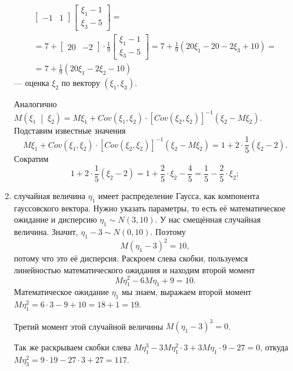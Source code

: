 \begin{enumerate}[label=\alph*)]
\begin{equation*}
\begin{split}
\begin{bmatrix}
        -1 & 1
      \end{bmatrix}
      \begin{bmatrix}
        \xi_1 - 1 \\
        \xi_3 - 5
      \end{bmatrix} = \\
      = 7 +
      \begin{bmatrix}
        20 & -2
      \end{bmatrix} \cdot \frac{1}{9}
      \begin{bmatrix}
        \xi_1 - 1 \\
        \xi_3 - 5
      \end{bmatrix} =
      7 + \frac{1}{9} \left( 20 \xi_1 - 20 - 2 \xi_3 + 10 \right) = \\
      = 7 + \frac{1}{9} \left( 20 \xi_1 - 2 \xi_2 - 10 \right)
    \end{split}
  \end{equation*}
  --- оценка $ \xi_2$ по вектору $ \left( \xi_1, \xi_3 \right) $.

  Аналогично
  $M \left( \xi_1 \; \middle| \; \xi_2 \right) =
    M \xi_1 + Cov \left( \xi_1, \xi_2 \right) \cdot
    \left[ Cov \left( \xi_2, \xi_2 \right) \right]^{-1} \left( \xi_2 - M \xi_2 \right).$
  Подставим известные значения
  $$M \xi_1 + Cov \left( \xi_1, \xi_2 \right) \cdot
    \left[ Cov \left( \xi_2, \xi_2 \right) \right]^{-1} \left( \xi_2 - M \xi_2 \right) =
    1 + 2 \cdot \frac{1}{5} \left( \xi_2 - 2 \right).$$
  Сократим
  $$1 + 2 \cdot \frac{1}{5} \left( \xi_2 - 2 \right) =
    1 + \frac{2}{5} \cdot \xi_2 - \frac{4}{5} =
    \frac{1}{5} - \frac{2}{5} \cdot \xi_2;$$
  \item случайная величина $ \eta_1$ имеет распределение Гаусса,
  как компонента гауссовского вектора.
  Нужно указать параметры, то есть её математическое ожидание и дисперсию
  $ \eta_1 \sim N \left( 3, 10 \right) $.
  У нас смещённая случайная величина.
  Значит, $ \eta_1 - 3 \sim N \left( 0, 10 \right) $.
  Поэтому
  $$M \left( \eta_1 - 3 \right)^2 =
    10,$$
  потому что это её дисперсия.
  Раскроем слева скобки,
  пользуемся линейностью математического ожидания и находим второй момент
  $$M \eta_1^2 - 6M \eta_1 + 9 =
    10.$$
  Математическое ожидание $ \eta_1$ мы знаем,
  выражаем второй момент $M \eta_1^2 = 6 \cdot 3 - 9 + 10 = 18 + 1 = 19$.

  Третий момент этой случайной величины $M \left( \eta_1 - 3 \right)^3 = 0$.

  Так же раскрываем скобки слева $M \eta_1^3 - 3M \eta_1^2 \cdot 3 + 3M \eta_1 \cdot 9 - 27 = 0$,
  откуда $M \eta_3^2 = 9 \cdot 19 - 27 \cdot 3 + 27 = 117$.


\end{enumerate}

